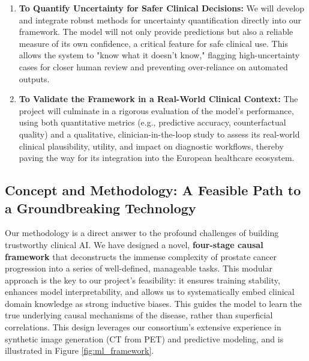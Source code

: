 \documentclass[11pt, a4paper]{article}
\begin{document}
\begin{enumerate}
    \item \textbf{To Quantify Uncertainty for Safer Clinical Decisions:} We will develop and integrate robust methods for uncertainty quantification directly into our framework. The model will not only provide predictions but also a reliable measure of its own confidence, a critical feature for safe clinical use. This allows the system to "know what it doesn't know," flagging high-uncertainty cases for closer human review and preventing over-reliance on automated outputs.
    \item \textbf{To Validate the Framework in a Real-World Clinical Context:} The project will culminate in a rigorous evaluation of the model's performance, using both quantitative metrics (e.g., predictive accuracy, counterfactual quality) and a qualitative, clinician-in-the-loop study to assess its real-world clinical plausibility, utility, and impact on diagnostic workflows, thereby paving the way for its integration into the European healthcare ecosystem.
\end{enumerate}

\subsection{Concept and Methodology: A Feasible Path to a Groundbreaking Technology}
Our methodology is a direct answer to the profound challenges of building trustworthy clinical AI. We have designed a novel, \textbf{four-stage causal framework} that deconstructs the immense complexity of prostate cancer progression into a series of well-defined, manageable tasks. This modular approach is the key to our project's feasibility: it ensures training stability, enhances model interpretability, and allows us to systematically embed clinical domain knowledge as strong inductive biases. This guides the model to learn the true underlying causal mechanisms of the disease, rather than superficial correlations. This design leverages our consortium's extensive experience in synthetic image generation (CT from PET) and predictive modeling, and is illustrated in Figure \ref{fig:ml_framework}.
\end{document}
